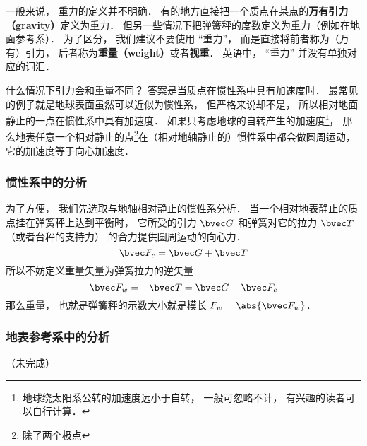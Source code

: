 

一般来说， 重力的定义并不明确． 有的地方直接把一个质点在某点的\textbf{万有引力（gravity）}定义为重力． 但另一些情况下把弹簧秤的度数定义为重力（例如在地面参考系）． 为了区分， 我们建议不要使用 “重力”， 而是直接将前者称为（万有）引力， 后者称为\textbf{重量（weight）}或者\textbf{视重}． 英语中， “重力” 并没有单独对应的词汇．

什么情况下引力会和重量不同？ 答案是当质点在惯性系中具有加速度时． 最常见的例子就是地球表面虽然可以近似为惯性系， 但严格来说却不是， 所以相对地面静止的一点在惯性系中具有加速度． 如果只考虑地球的自转产生的加速度\footnote{地球绕太阳系公转的加速度远小于自转， 一般可忽略不计， 有兴趣的读者可以自行计算．}， 那么地表任意一个相对静止的点\footnote{除了两个极点}在（相对地轴静止的）惯性系中都会做圆周运动， 它的加速度等于向心加速度．

\subsubsection{惯性系中的分析}
为了方便， 我们先选取与地轴相对静止的惯性系分析． 当一个相对地表静止的质点挂在弹簧秤上达到平衡时， 它所受的引力 $\bvec G$ 和弹簧对它的拉力 $\bvec T$（或者台秤的支持力） 的合力提供圆周运动的向心力．
\begin{equation}
\bvec F_c = \bvec G + \bvec T
\end{equation}
所以不妨定义重量矢量为弹簧拉力的逆矢量
\begin{equation}
\bvec F_w = -\bvec T = \bvec G - \bvec F_c
\end{equation}
那么重量， 也就是弹簧秤的示数大小就是模长 $F_w = \abs{\bvec F_w}$．


\subsubsection{地表参考系中的分析}

（未完成）
